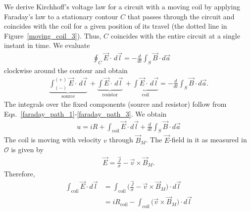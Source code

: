 \documentclass[12pt,a4paper,oneside]{book}
\begin{document}
\begin{onehalfspace}
We derive Kirchhoff's voltage law for a circuit with a moving coil by applying Faraday's law to a stationary contour $C$ that passes through the circuit and coincides with the coil for a given position of its travel (the dotted line in Figure~\ref{moving_coil_3}). Thus, $C$ coincides with the entire circuit at a single instant in time. We evaluate
 \begin{equation}\label{faraday_mc_1}
	\begin{aligned}
		&\oint_C \vec{E}\cdot\,d\vec{l}=-\frac{d}{d t}\int_S\vec{B}\cdot d\vec{a}
	\end{aligned}
\end{equation} 
clockwise around the contour and obtain 
\begin{equation}\label{faraday_path_4}
	\begin{aligned}
		\underbrace{\int_{(-)}^{(+)}\vec{E}\cdot\,d\vec{l}}_{\text{source}} \, + \underbrace{\int\vec{E}\cdot\,d\vec{l}}_{\text{resistor}} \, + 
		\underbrace{\int\vec{E}\cdot\,d\vec{l}}_{\text{coil}} = - \frac{d}{dt}\int_S\vec{B}\cdot d\vec{a} .
	\end{aligned}
\end{equation} 
The integrals over the fixed components (source and resistor) follow from Eqs.~\eqref{faraday_path_1}-\ref{faraday_path_3}. We obtain
 \begin{equation}\label{faraday_path_5}
	\begin{aligned}
		u = iR+\int_{\text{coil}}\vec{E}\cdot d\vec{l} + \frac{d}{dt}\int_S\vec{B}\cdot d\vec{a}
	\end{aligned}
\end{equation} 
The coil is moving with velocity $v$ through $\vec{B}_M$. The $\vec{E}$-field in it as measured in $\mathcal{O}$ is given by
\begin{equation}\label{faraday_path_6}
	\begin{aligned}
		\vec{E}=\frac{\vec{J}}{\sigma} - \vec{v}\times\vec{B}_M.
	\end{aligned}
\end{equation} 
Therefore,
\begin{equation}\label{faraday_path_7}
	\begin{aligned}
		\int_{\text{coil}}\vec{E}\cdot d\vec{l}&=\int_{\text{coil}}\Big(\frac{\vec{J}}{\sigma}-\vec{v}\times\vec{B}_M\Big)\cdot d\vec{l} \\[8pt]
		&=iR_{\text{coil}} - \int_{\text{coil}}\big(\vec{v}\times\vec{B}_M\big)\cdot d\vec{l}
	\end{aligned}
\end{equation} 

\end{onehalfspace}
\end{document}
